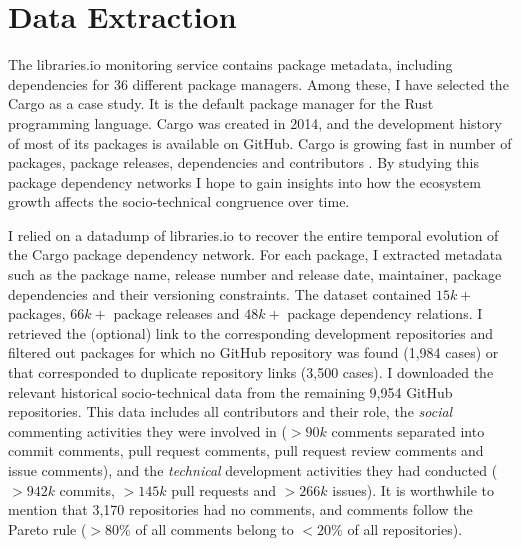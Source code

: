 \section{Data Extraction}

The \textsf{libraries.io} monitoring service contains package metadata, including dependencies for 36 different package managers.
Among these, I have selected the Cargo as a case study. It is the default package manager for %
the Rust programming language. Cargo was created in 2014, and the development history of most of its packages is available on GitHub. 
Cargo is growing fast in number of packages, package releases, dependencies and contributors \cite{Decan2019EMSE}. 
By studying this package dependency networks I hope to gain insights into how the ecosystem growth affects the socio-technical congruence over time.

I relied on a datadump of libraries.io \cite{Katz2018} to recover the entire temporal evolution of the Cargo package dependency network. 
For each package, I extracted metadata such as the package name, release number and release date, maintainer, package dependencies and their versioning constraints. 
The dataset contained $15k+$ packages, $66k+$ package releases and $48k+$ package dependency relations.
I retrieved the (optional) link to the corresponding development repositories and filtered out packages for which no GitHub repository was found (1,984 cases) %
or that corresponded to duplicate repository links (3,500 cases).
I downloaded the relevant historical socio-technical data from the remaining 9,954 GitHub repositories.
This data includes all contributors and their role, the \emph{social} commenting activities they were involved in ($>90k$ comments separated into commit comments, pull request comments, pull request review comments and issue comments), and the \emph{technical} development activities they had conducted ($>942k$ commits, $>145k$ pull requests and $>266k$ issues).
It is worthwhile to mention that 3,170 repositories had no comments, and comments follow the Pareto rule ($>80\%$ of all comments belong to $<20\%$ of all repositories).